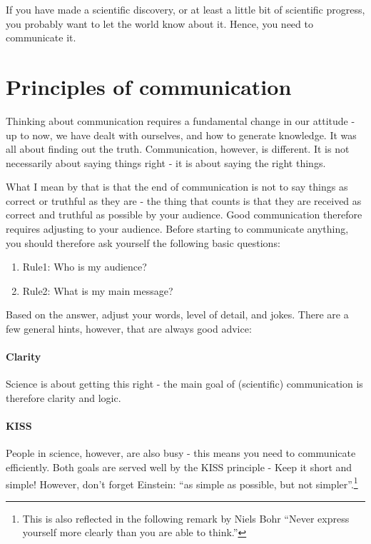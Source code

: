 \documentclass{tufte-book}
\begin{document}
If you have made a scientific discovery, or at least a little bit of scientific progress, you probably want to let the world know about it. Hence, you need to communicate it.

\section{Principles of communication}

Thinking about communication requires a fundamental change in our attitude - up to now, we have dealt with ourselves, and how to generate knowledge. It was all about finding out the truth. Communication, however, is different. It is not necessarily about saying things right - it is about saying the right things. 

What I mean by that is that the end of communication is not to say things as correct or truthful as they are - the thing that counts is that they are received as correct and truthful as possible by your audience. Good communication therefore requires adjusting to your audience. Before starting to communicate anything, you should therefore ask yourself the following basic questions:


\begin{enumerate}
\item Rule1: Who is my audience?
\item Rule2: What is my main message?
\end{enumerate}

Based on the answer, adjust your words, level of detail, and jokes. There are a few general hints, however, that are always good advice:



\paragraph{Clarity} Science is about getting this right - the main goal of (scientific) communication is therefore clarity and logic. 

\paragraph{KISS} People in science, however, are also busy - this means you need to communicate efficiently. Both goals are served well by the KISS principle - Keep it short and simple! However, don't forget Einstein: “as simple as possible, but not simpler”.\footnote{This is also reflected in the following remark by Niels Bohr “Never express yourself more clearly than you are able to think.”}
\end{document}
